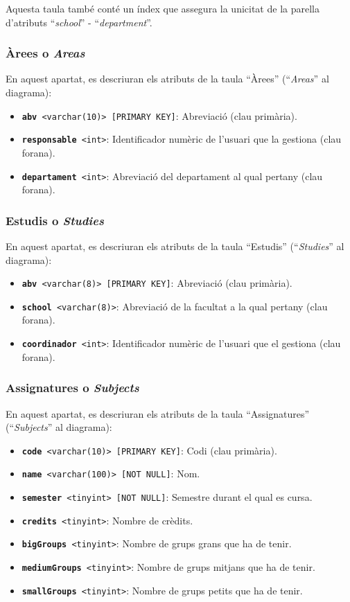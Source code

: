 \documentclass[a4paper,12pt]{ThesisStyle}
\begin{document}
Aquesta taula també conté un índex que assegura la unicitat de la parella d'atributs ``\textit{school}'' - ``\textit{department}''.

\subsubsection{Àrees o \textit{Areas}}

En aquest apartat, es descriuran els atributs de la taula ``Àrees'' (``\textit{Areas}'' al diagrama):
\begin{itemize}
  \item \texttt{\textbf{abv} <varchar(10)> [PRIMARY KEY]}: Abreviació (clau primària).
  \item \texttt{\textbf{responsable} <int>}: Identificador numèric de l'usuari que la gestiona (clau forana).
  \item \texttt{\textbf{departament} <int>}: Abreviació del departament al qual pertany (clau forana).
\end{itemize}

\subsubsection{Estudis o \textit{Studies}}

En aquest apartat, es descriuran els atributs de la taula ``Estudis'' (``\textit{Studies}'' al diagrama):
\begin{itemize}
  \item \texttt{\textbf{abv} <varchar(8)> [PRIMARY KEY]}: Abreviació (clau primària).
  \item \texttt{\textbf{school} <varchar(8)>}: Abreviació de la facultat a la qual pertany (clau forana).
  \item \texttt{\textbf{coordinador} <int>}: Identificador numèric de l'usuari que el gestiona (clau forana).
\end{itemize}

\subsubsection{Assignatures o \textit{Subjects}}

En aquest apartat, es descriuran els atributs de la taula ``Assignatures'' (``\textit{Subjects}'' al diagrama):
\begin{itemize}
  \item \texttt{\textbf{code} <varchar(10)> [PRIMARY KEY]}: Codi (clau primària).
  \item \texttt{\textbf{name} <varchar(100)> [NOT NULL]}: Nom.
  \item \texttt{\textbf{semester} <tinyint> [NOT NULL]}: Semestre durant el qual es cursa.
  \item \texttt{\textbf{credits} <tinyint>}: Nombre de crèdits.
  \item \texttt{\textbf{bigGroups} <tinyint>}: Nombre de grups grans que ha de tenir.
  \item \texttt{\textbf{mediumGroups} <tinyint>}: Nombre de grups mitjans que ha de tenir.
  \item \texttt{\textbf{smallGroups} <tinyint>}: Nombre de grups petits que ha de tenir.
\end{itemize}
\end{document}
